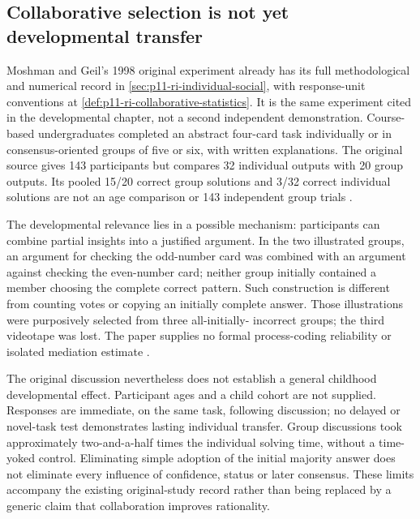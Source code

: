 \subsection{Collaborative selection is not yet developmental transfer}
\label{sec:p19-r151-collaborative-interface}

Moshman and Geil's 1998 original experiment already has its full methodological
and numerical record in \cref{sec:p11-ri-individual-social}, with response-unit
conventions at \cref{def:p11-ri-collaborative-statistics}. It is the same
experiment cited in the developmental chapter, not a second independent
demonstration. Course-based undergraduates completed an abstract four-card
task individually or in consensus-oriented groups of five or six, with
written explanations. The original source gives 143 participants but compares
32 individual outputs with 20 group outputs. Its pooled 15/20 correct group
solutions and 3/32 correct individual solutions are not an age comparison
or 143 independent group trials
\cite[pp.~233--236]{MoshmanGeil1998CollaborativeReasoning}.

The developmental relevance lies in a possible mechanism: participants can
combine partial insights into a justified argument. In the two illustrated
groups, an argument for checking the odd-number card was combined with
an argument against checking the even-number card; neither group initially
contained a member choosing the complete correct pattern. Such construction
is different from counting votes or copying an initially complete answer.
Those illustrations were purposively selected from three all-initially-
incorrect groups; the third videotape was lost. The paper supplies no
formal process-coding reliability or isolated mediation estimate
\cite[pp.~237--245]{MoshmanGeil1998CollaborativeReasoning}.

The original discussion nevertheless does not establish a general childhood
developmental effect. Participant ages and a child cohort are not supplied.
Responses are immediate, on the same task, following discussion; no delayed
or novel-task test demonstrates lasting individual transfer. Group discussions
took approximately two-and-a-half times the individual solving time, without
a time-yoked control. Eliminating simple adoption of the initial majority
answer does not eliminate every influence of confidence, status or later
consensus. These limits accompany the existing original-study record rather
than being replaced by a generic claim that collaboration improves rationality.

